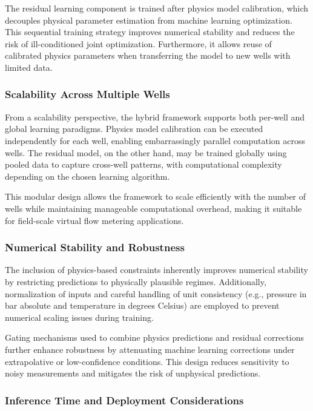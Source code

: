\documentclass[12pt,APA]{uomthesis}
\begin{document}
The residual learning component is trained after physics model calibration, which decouples physical parameter estimation from machine learning optimization. This sequential training strategy improves numerical stability and reduces the risk of ill-conditioned joint optimization. Furthermore, it allows reuse of calibrated physics parameters when transferring the model to new wells with limited data.

\subsubsection{Scalability Across Multiple Wells}

From a scalability perspective, the hybrid framework supports both per-well and global learning paradigms. Physics model calibration can be executed independently for each well, enabling embarrassingly parallel computation across wells. The residual model, on the other hand, may be trained globally using pooled data to capture cross-well patterns, with computational complexity depending on the chosen learning algorithm.

This modular design allows the framework to scale efficiently with the number of wells while maintaining manageable computational overhead, making it suitable for field-scale virtual flow metering applications.

\subsubsection{Numerical Stability and Robustness}

The inclusion of physics-based constraints inherently improves numerical stability by restricting predictions to physically plausible regimes. Additionally, normalization of inputs and careful handling of unit consistency (e.g., pressure in bar absolute and temperature in degrees Celsius) are employed to prevent numerical scaling issues during training.

Gating mechanisms used to combine physics predictions and residual corrections further enhance robustness by attenuating machine learning corrections under extrapolative or low-confidence conditions. This design reduces sensitivity to noisy measurements and mitigates the risk of unphysical predictions.

\subsubsection{Inference Time and Deployment Considerations}
\end{document}
